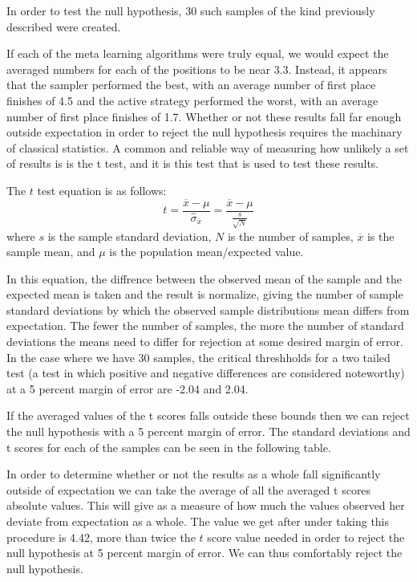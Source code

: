 \documentclass{article}
\begin{document}
In order to test the null hypothesis, 30 such samples of the kind previously
described were created.

If each of the meta learning algorithms were truly equal, we would expect the
averaged numbers for each of the positions to be near 3.3. Instead, it appears
that the sampler performed the best, with an average number of first place
finishes of 4.5 and the active strategy performed the worst, with an average
number of first place finishes of 1.7. Whether or not these results fall far
enough outside expectation in order to reject the null hypothesis requires the
machinary of classical statistics. A common and reliable way of  measuring
how unlikely a set of results is is the t test, and it is this test that is used
to test these results.

The $t$ test equation is as follows:
$$t =\frac{\overline{x}-\mu}{\hat{\sigma}_{\overline{x}}} = \frac{\overline{x}-\mu}{\frac{s}{\sqrt{N}}}$$
where $s$ is the sample standard deviation, $N$ is the number of samples,
$\overline{x}$ is the  sample mean, and $\mu$ is the population mean/expected value.

In this equation, the diffrence between the observed mean of the sample
and the expected mean is taken and the result is normalize, giving the number
of sample standard deviations by which the observed sample distributions mean
differs from expectation. The fewer the number of samples, the more the number
of standard deviations the means need to differ for rejection at some desired
margin of error. In the case where we have 30 samples, the critical threshholds
for a two tailed test (a test in which positive and negative differences are
considered noteworthy) at a 5 percent margin of error are -2.04 and 2.04.

If the averaged values of the t scores falls outside these bounds then we can
reject the null hypothesis with a 5 percent margin of error. The standard
deviations and t scores for each of the samples can be seen in the following
table.

In order to determine whether or not the results as a whole fall significantly
outside of expectation we can take the average of all the averaged t scores
absolute values. This will give as a measure of how much the values observed her
deviate from expectation as a whole. The value we get after under taking this
procedure is 4.42, more than twice the $t$ score value needed in order to
reject the null hypothesis at 5 percent margin of error. We can thus comfortably
reject the null hypothesis.
\end{document}
